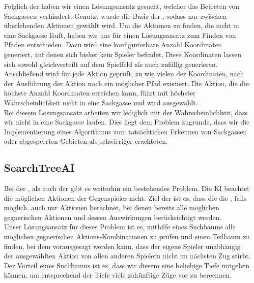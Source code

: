 Folglich der  haben wir einen Lösungsansatz gesucht, welcher das Betreten von Sackgassen
verhindert.
Genutzt wurde die Basis der , sodass nur zwischen überlebenden Aktionen gewählt wird.
Um die Aktionen zu finden, die nicht in eine Sackgasse läuft, haben wir uns für einen Lösungsansatz zum Finden von
Pfaden entschieden.
Dazu wird eine konfigurierbare Anzahl Koordinaten generiert, auf denen sich bisher kein Spieler befindet.
Diese Koordinaten lassen sich sowohl gleichverteilt auf dem Spielfeld als auch zufällig generieren.
Anschließend wird für jede Aktion geprüft, zu wie vielen der Koordinaten, nach der Ausführung der Aktion noch ein
möglicher Pfad existiert. 
Die Aktion, die die höchste Anzahl Koordinaten erreichen kann, führt mit höchster Wahrscheinlichkeit
nicht in eine Sackgasse und wird ausgewählt. \\

Bei diesem Lösungsansatz arbeiten wir lediglich mit der Wahrscheinlichkeit, dass wir nicht in eine Sackgasse laufen.
Dies liegt dem Problem zugrunde, dass wir die Implementierung eines Algorithmus zum tatsächtichen Erkennen von
Sackgassen oder abgesperrten Gebieten als schwieriger erachteten.

\subsection{SearchTreeAI}
\label{subsec:searchtree-ai}

Bei der , als auch der  gibt es weiterhin ein bestehendes
Problem.
Die \ac{KI} beachtet die möglichen Aktionen der Gegenspieler nicht.
Ziel der  ist es, dass die die , falls möglich, auch nur Aktionen berechnet,
bei denen bereits alle möglichen gegnerischen Aktionen und dessen Auswirkungen berücksichtigt werden. \\

Unser Lösungsansatz für dieses Problem ist es, mithilfe eines Suchbaums alle möglichen gegnerischen
Aktions-Kombinationen zu prüfen und einen Teilbaum zu finden, bei dem vorausgesagt werden kann, dass
der eigene Spieler unabhängig der ausgewählten Aktion von allen anderen Spielern nicht im nächsten Zug stirbt.
Der Vorteil eines Suchbaums ist es, dass wir diesem eine
beliebige Tiefe mitgeben können, um entsprechend der Tiefe viele zukünftige Züge vor zu berechnen.

